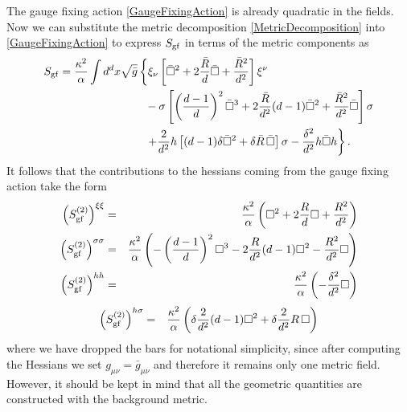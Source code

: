 \documentclass[notitlepage,eqsecnum,bm,amsmath,preprintnumbers,superscriptaddress,nofootinbib,aps,11pt]{revtex4-1}
\begin{document}
The gauge fixing action \eqref{GaugeFixingAction} is already quadratic in the fields. Now we can substitute the metric decomposition \eqref{MetricDecomposition} into \eqref{GaugeFixingAction}  to express $S_{\rm gf}$ in terms of the metric components as
\begin{equation}
\begin{split}
S_{\rm gf}=\frac{\kappa^2}{\alpha}\int d^dx\sqrt{\bar g}&
\left\{ \xi_{\nu}\left[\bar \Box^2+2\frac{\bar R}{d}\bar \Box+\frac{\bar R^2}{d^2}\right]\xi^{\nu}\right.\\
&\ \ -\sigma\left[\left(\frac{d-1}{d}\right)^2\bar \Box^3+2\frac{\bar R}{d^2}(d-1)\bar \Box^2+\frac{\bar R^2}{d^2}\bar \Box\right]\sigma\\
&\ \ \left.+\frac{2}{d^2}h\left[(d-1)\delta\bar \Box^2+\delta \bar R\,\bar \Box\right]\sigma-\frac{\delta^2}{d^2}h\bar \Box h \right\}.
\end{split}
\end{equation}
It follows that the contributions to the hessians  coming from the gauge fixing action take the form
\begin{eqnarray}
\left(S^{(2)}_{\rm gf}\right)^{\xi\xi}&=& \frac{\kappa^2}{\alpha}\left(\Box^2+2\frac{R}{d} \Box+\frac{ R^2}{d^2}\right)\\
\left(S^{(2)}_{\rm gf}\right)^{\sigma \sigma}&=&\frac{\kappa^2}{\alpha}\left(-\left(\frac{d-1}{d}\right)^2 \Box^3-2\frac{ R}{d^2}(d-1) \Box^2-\frac{ R^2}{d^2} \Box\right)
\\
\left(S^{(2)}_{\rm gf}\right)^{hh}&=&\frac{\kappa^2}{\alpha}\left(-\frac{\delta^2}{d^2} \Box\right)
\end{eqnarray}
\begin{eqnarray} 
\left(S^{(2)}_{\rm gf}\right)^{h\sigma}&=&\frac{\kappa^2}{\alpha}\left(\delta\frac{2}{d^2}(d-1) \Box^2+\delta \frac{2}{d^2} R\, \Box\right)
\end{eqnarray}
where we have dropped the bars for notational simplicity, since after computing the Hessians we set $g_{\mu\nu}=\bar g_{\mu\nu}$ and therefore it remains only one metric field. However, it should be kept in mind that all the geometric quantities are constructed with the background metric. 
 
 
\end{document}
